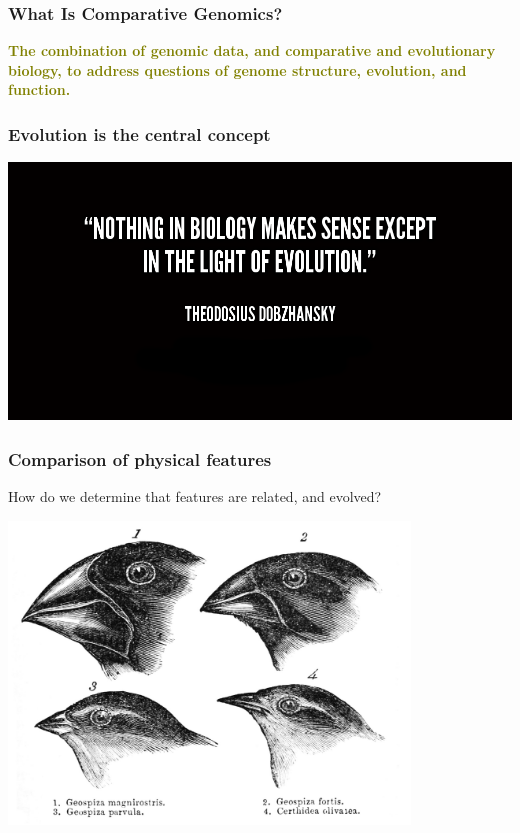 




%
\begin{frame}
  \frametitle{What Is Comparative Genomics?}
  \Large{
    \textcolor{olive}{
      \textbf{
      The combination of genomic data, and comparative and evolutionary biology, to address questions of   genome structure, evolution, and function.
      }
    }
  }
\end{frame}

%
\begin{frame}
  \frametitle{Evolution is the central concept}
  \begin{center}
    \includegraphics[width=\textwidth]{images/dobzhansky_quote}
  \end{center}  
\end{frame}

%
\begin{frame}
  \frametitle{Comparison of physical features}
  How do we determine that features are related, and evolved? \\
  \begin{center}
    \includegraphics[width=0.8\textwidth]{images/darwin_finches}
  \end{center}  
\end{frame}

